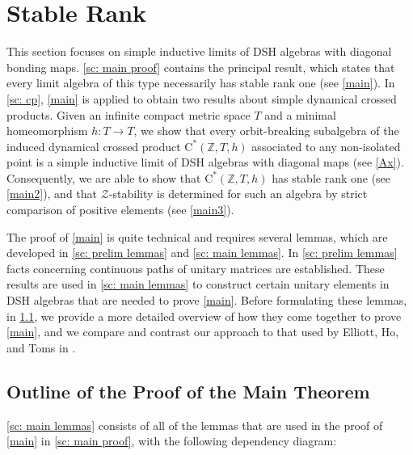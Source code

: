 \documentclass[12pt]{amsart}
\numberwithin{equation}{section}
\theoremstyle{definition}
\theoremstyle{remark}
\begin{document}
\section{Stable Rank}
\label{ch: stable rank}

This section focuses on simple inductive limits of DSH algebras with diagonal bonding maps. \cref{sc: main proof} contains the principal result, which states that every limit algebra of this type necessarily has stable rank one (see \autoref{main}). In \cref{sc: cp}, \autoref{main} is applied to obtain two results about simple dynamical crossed products. Given an infinite compact metric space $T$ and a minimal homeomorphism $h\colon T\to T$, we show that every orbit-breaking subalgebra of the induced dynamical crossed product $\mathrm{C}^{*}(\mathbb{Z},T,h)$ associated to any non-isolated point is a simple inductive limit of DSH algebras with diagonal maps (see \autoref{Ax}). Consequently, we are able to show that $\mathrm{C}^{*}(\mathbb{Z},T,h)$ has stable rank one (see \autoref{main2}), and that $\mathcal{Z}$-stability is determined for such an algebra by strict comparison of positive elements (see \autoref{main3}). 

The proof of \autoref{main} is quite technical and requires several lemmas, which are developed in \cref{sc: prelim lemmas} and \cref{sc: main lemmas}. In \cref{sc: prelim lemmas} facts concerning continuous paths of unitary matrices are established. These results are used in \cref{sc: main lemmas} to construct certain unitary elements in DSH algebras that are needed to prove \autoref{main}. Before formulating these lemmas, in \cref{sc: outline of proof}, we provide a more detailed overview of how they come together to prove \autoref{main}, and we compare and contrast our approach to that used by Elliott, Ho, and Toms in \cite{EHT}.




\subsection{Outline of the Proof of the Main Theorem}
\label{sc: outline of proof}

\cref{sc: main lemmas} consists of all of the lemmas that are used in the proof of \autoref{main} in \cref{sc: main proof}, with the following dependency diagram:
\end{document}
